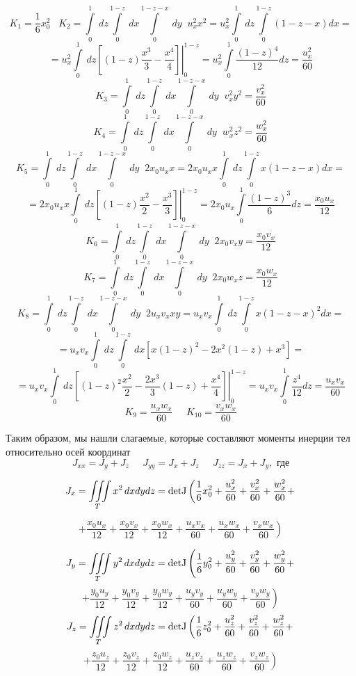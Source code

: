 \documentclass[a4paper,12pt, titlepage]{article}
\begin{document}
$$K_1 = \frac{1}{6}x_0^2\;\;\;K_2 = \int \limits_{0}^{1}~dz \int \limits_{0}^{1-z}~dx \int \limits_{0}^{1-z-x}~dy\;\;u_x^2 x^2 = 
u_x^2 \int \limits_{0}^{1}~dz \int \limits_{0}^{1-z}(1-z-x)dx =$$
$$
= u_x^2 \int \limits_{0}^{1}~dz \left.\left[ (1-z)\frac{x^3}{3} - \frac{x^4}{4}\right] \right|^{1-z}_{0}  
= u_x^2 \int \limits_{0}^{1}\frac{(1-z)^4}{12}dz = \frac{u_x^2}{60}
$$ 
$$K_3 = \int \limits_{0}^{1}~dz \int \limits_{0}^{1-z}~dx \int \limits_{0}^{1-z-x}~dy\;\;v_x^2 y^2 = \frac{v_x^2}{60}$$
$$K_4 = \int \limits_{0}^{1}~dz \int \limits_{0}^{1-z}~dx \int \limits_{0}^{1-z-x}~dy\;\;w_x^2 z^2 = \frac{w_x^2}{60}$$
$$K_5 = \int \limits_{0}^{1}~dz \int \limits_{0}^{1-z}~dx \int \limits_{0}^{1-z-x}~dy\;\;2x_0 u_x x 
= 2x_0 u_x x \int \limits_{0}^{1}~dz \int \limits_{0}^{1-z}x(1-z-x)dx =$$
$$
= 2x_0 u_x x \int \limits_{0}^{1}~dz \left.\left[ (1-z)\frac{x^2}{2} - \frac{x^3}{3}\right] \right|^{1-z}_{0}
= 2x_0 u_x \int \limits_{0}^{1}\frac{(1-z)^3}{6}dz = \frac{x_0 u_x}{12}$$
$$K_6 = \int \limits_{0}^{1}~dz \int \limits_{0}^{1-z}~dx \int \limits_{0}^{1-z-x}~dy\;\; 2x_0 v_x y = \frac{x_0 v_x}{12}$$
$$K_7 = \int \limits_{0}^{1}~dz \int \limits_{0}^{1-z}~dx \int \limits_{0}^{1-z-x}~dy\;\; 2x_0 w_x z = \frac{x_0 w_x}{12}$$
$$K_8 = \int \limits_{0}^{1}~dz \int \limits_{0}^{1-z}~dx \int \limits_{0}^{1-z-x}~dy\;\; 2u_x v_x xy
= u_xv_x\int \limits_{0}^{1}~dz \int \limits_{0}^{1-z}x(1-z-x)^2dx =$$
$$
= u_x v_x\int \limits_{0}^{1}~dz \int \limits_{0}^{1-z}~dx\left[ x(1-z)^2 - 2x^2(1-z) + x^3\right] =$$
$$
= u_x v_x\int \limits_{0}^{1}~dz \left.\left[ (1-z)^2\frac{x^2}{2} - \frac{2x^3}{3}(1-z) + \frac{x^4}{4}\right] \right|^{1-z}_{0}
= u_x v_x\int \limits_{0}^{1}\frac{z^4}{12} dz = \frac{u_x v_x}{60}$$
$$K_9 = \frac{u_x w_x}{60}\;\;\;\;\;K_{10} = \frac{v_x w_x}{60}$$

Таким образом, мы нашли слагаемые, которые составляют моменты инерции тел относительно осей координат 
$$ J_{xx} = J_{y} + J_{z}\;\;\;\;\;J_{yy} = J_{x} + J_{z}\;\;\;\;\;J_{zz} = J_{x} + J_{y},\text{ где}$$

$$
J_x =\iiint \limits_T {x}^2 \,dxdydz = {\rm detJ}\left( \frac{1}{6}x_0^2 
+ \frac{u_x^2}{60} + \frac{v_x^2}{60} + \frac{w_x^2}{60} +\right.
$$

$$
\left. + \frac{x_0 u_x}{12} + \frac{x_0 v_x}{12} + \frac{x_0 w_x}{12}
+ \frac{u_x v_x}{60} + \frac{u_x w_x}{60} + \frac{v_x w_x}{60}
\right)
$$

$$
J_y =\iiint \limits_T {y}^2 \,dxdydz = {\rm detJ}\left( \frac{1}{6}y_0^2 
+ \frac{u_y^2}{60} + \frac{v_y^2}{60} + \frac{w_y^2}{60} +\right.
$$
$$
\left.+ \frac{y_0 u_y}{12} + \frac{y_0 v_y}{12} + \frac{y_0 w_y}{12}
+ \frac{u_y v_y}{60} + \frac{u_y w_y}{60} + \frac{v_y w_y}{60}
\right)
$$
$$
J_z =\iiint \limits_T {z}^2 \,dxdydz = {\rm detJ}\left( \frac{1}{6}z_0^2 
+ \frac{u_z^2}{60} + \frac{v_z^2}{60} + \frac{w_z^2}{60} +\right.
$$
$$
\left.+ \frac{z_0 u_z}{12} + \frac{z_0 v_z}{12} + \frac{z_0 w_z}{12}
+ \frac{u_z v_z}{60} + \frac{u_z w_z}{60} + \frac{v_z w_z}{60}
\right)
$$
\end{document}
